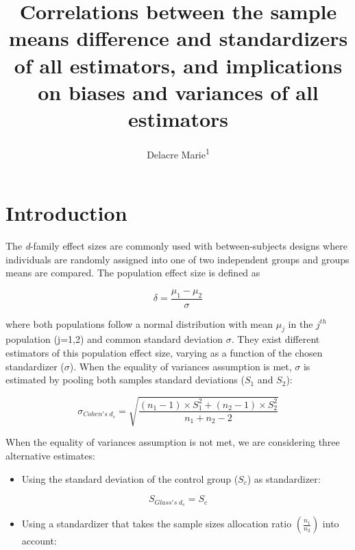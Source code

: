 \documentclass[
  man]{apa6}
\affiliation{
\vspace{0.5cm}
\textsuperscript{1} ULB}
\title{Correlations between the sample means difference and standardizers of all estimators, and implications on biases and variances of all estimators}
\author{Delacre Marie\textsuperscript{1}}
\date{}
\providecommand{\tightlist}{%
  \setlength{\itemsep}{0pt}\setlength{\parskip}{0pt}}
\begin{document}
\maketitle

\hypertarget{introduction}{%
\section{Introduction}\label{introduction}}

The \emph{d}-family effect sizes are commonly used with between-subjects designs where individuals are randomly assigned into one of two independent groups and groups means are compared. The population effect size is defined as

\begin{equation} 
\delta = \frac{\mu_{1}-\mu_{2}}{\sigma} 
\label{eq:Cohendelta}
\end{equation}

where both populations follow a normal distribution with mean \(\mu_j\) in the \(j^{th}\) population (j=1,2) and common standard deviation \(\sigma\). They exist different estimators of this population effect size, varying as a function of the chosen standardizer (\(\sigma\)). When the equality of variances assumption is met, \(\sigma\) is estimated by pooling both samples standard deviations (\(S_1\) and \(S_2\)):

\begin{equation} 
\sigma_{Cohen's \; d_s} = \sqrt{\frac{(n_1-1) \times S_1^2+(n_2-1) \times S_2^2}{n_1+n_2-2}}
\label{eq:Cohends}
\end{equation}

When the equality of variances assumption is not met, we are considering three alternative estimates:

\begin{itemize}
\tightlist
\item
  Using the standard deviation of the control group (\(S_c\)) as standardizer:
\end{itemize}

\begin{equation} 
S_{Glass's \; d_s} = S_{c}
\label{eq:Glassds}
\end{equation}

\begin{itemize}
\tightlist
\item
  Using a standardizer that takes the sample sizes allocation ratio \(\left( \frac{n_1}{n_2}\right)\) into account:
\end{itemize}
\end{document}
